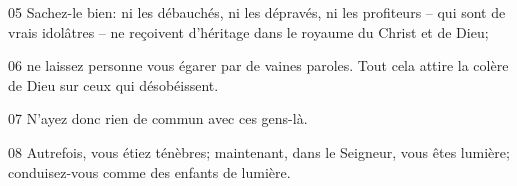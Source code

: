 
05 Sachez-le bien: ni les débauchés, ni les dépravés, ni les profiteurs – qui sont de vrais idolâtres – ne reçoivent d’héritage dans le royaume du Christ et de Dieu;

06 ne laissez personne vous égarer par de vaines paroles. Tout cela attire la colère de Dieu sur ceux qui désobéissent.

07 N’ayez donc rien de commun avec ces gens-là.

08 Autrefois, vous étiez ténèbres; maintenant, dans le Seigneur, vous êtes lumière; conduisez-vous comme des enfants de lumière.